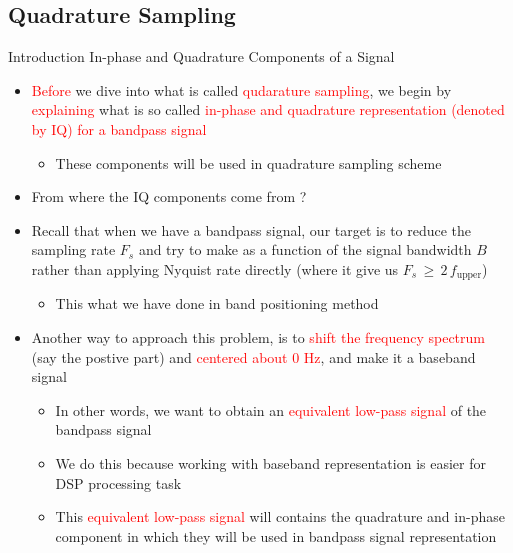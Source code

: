 \documentclass{beamer}
\begin{document}
\subsection{Quadrature Sampling}
\begin{frame}[t,allowframebreaks]{Introduction In-phase and Quadrature Components of a Signal}

\begin{itemize}

\item \textcolor{red}{Before} we dive into what is called \textcolor{red}{qudarature sampling}, we begin by \textcolor{red}{explaining} what is so called \textcolor{red}{in-phase and quadrature representation (denoted by IQ) for a bandpass signal}

	\begin{itemize}
	\item These components will be used in quadrature sampling scheme
	\end{itemize}

\item From where the IQ components come from ?

\item Recall that when we have a bandpass signal, our target is to reduce the sampling rate $F_s$ and try to make as a function of the signal bandwidth $B$ rather than applying Nyquist rate directly (where it give us $F_s \, \geq \, 2 \, f_{\text{upper}}$)

	\begin{itemize}
	\item This what we have done in band positioning method
	\end{itemize}

\newpage
\item Another way to approach this problem, is to \textcolor{red}{shift the frequency spectrum} (say the postive part) and \textcolor{red}{centered about 0 Hz}, and make it a baseband signal
	
	\begin{itemize}
	\item In other words, we want to obtain an \textcolor{red}{equivalent low-pass signal} of the bandpass signal
	
	\item We do this because working with baseband representation is easier for DSP processing task
	
	\item This \textcolor{red}{equivalent low-pass signal} will contains the quadrature and in-phase component in which they will be used in bandpass signal representation
	\end{itemize}

\end{itemize}

\end{frame}
\end{document}
